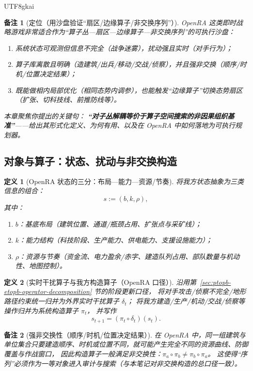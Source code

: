 \documentclass[12pt]{article}
\newtheorem{definition}{定义}[section]
\newtheorem{remark}{备注}[section]
\begin{document}
\begin{CJK*}{UTF8}{gkai}
\begin{remark}[定位（用沙盘验证“扇区/边缘算子/非交换序列”）]
\textsf{OpenRA} 这类即时战略游戏非常适合作为“算子丛—扇区—边缘算子—非交换序列”的可执行沙盘：
\begin{enumerate}
  \item 系统状态可观测但信息不完全（战争迷雾），扰动强且实时（对手行为）；
  \item 算子库离散且明确（造建筑/出兵/移动/交战/侦察），并且强非交换（顺序/时机/位置决定结果）；
  \item 既能做相内局部优化（相同态势内调参），也能触发“边缘算子”切换态势扇区（扩张、切科技线、前推防线等）。
\end{enumerate}
本章聚焦你提出的关键句：
\textbf{“对子丛解耦等价于算子空间搜索的非因果组织基准”}——给出其形式化定义、为何有用、以及在 \textsf{OpenRA} 中如何落地为可执行规划器。
\end{remark}

\subsection{对象与算子：状态、扰动与非交换构造}
\label{sec:openra-state-and-operators}

\begin{definition}[OpenRA 状态的三分：布局—能力—资源/节奏]
将我方状态抽象为三类信息的组合：
\[
  s := (b,k,\rho),
\]
其中：
\begin{enumerate}
  \item $b$：基底布局（建筑位置、通道/瓶颈占用、扩张点与采矿线）；
  \item $k$：能力结构（科技阶段、生产能力、供电能力、支援设施能力）；
  \item $\rho$：资源与节奏（资金流、电力盈余/赤字、建造队列占用、部队数量与机动性、地图控制）。
\end{enumerate}
\end{definition}

\begin{definition}[实时干扰算子与我方构造算子（OpenRA 口径）]
沿用第~\ref{sec:ptopb-etopb-operator-decomposition} 节的阶段更新口径，
将对手攻击/侦察不完全/地形路径约束统一归并为外界实时干扰算子 $\delta_t$；
将我方建造/生产/机动/交战/侦察等操作归并为系统构造算子 $\pi_t$，
并写作
\[
  s_{t+1} = (\pi_t\circ \delta_t)(s_t).
\]
\end{definition}

\begin{remark}[强非交换性（顺序/时机/位置决定结果）]
在 \textsf{OpenRA} 中，同一组建筑与单位集合只要建造顺序、时机或位置不同，就可能产生完全不同的资源曲线、防御覆盖与作战窗口，
因此构造算子一般满足非交换性：$\pi_a\circ\pi_b\neq \pi_b\circ\pi_a$。
这使得“序列”必须作为一等对象进入审计与搜索（与本笔记对非交换构造的总口径一致）。
\end{remark}


\end{CJK*}
\end{document}
